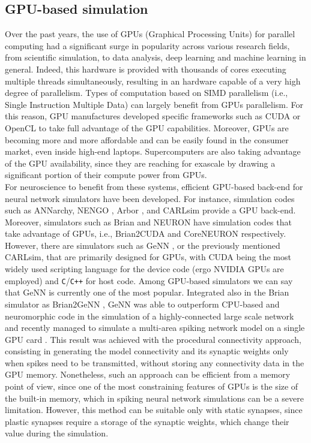 \documentclass[a4paper, 12pt, twoside, openright]{book}
\begin{document}
\subsection{GPU-based simulation}
Over the past years, the use of GPUs (Graphical Processing Units) for parallel computing had a significant surge in  popularity across various research fields, from scientific simulation, to data analysis, deep learning and machine learning in general. Indeed, this hardware is provided with thousands of cores executing multiple threads simultaneously, resulting in an hardware capable of a very high degree of parallelism. Types of computation based on SIMD parallelism (i.e., Single Instruction Multiple Data) can largely benefit from GPUs parallelism. For this reason, GPU manufactures developed specific frameworks such as CUDA or OpenCL to take full advantage of the GPU capabilities. Moreover, GPUs are becoming more and more affordable and can be easily found in the consumer market, even inside high-end laptops.
Supercomputers are also taking advantage of the GPU availability, since they are reaching for exascale by drawing a significant portion of their compute power from GPUs.\\
For neuroscience to benefit from these systems, efficient GPU-based back-end for neural network simulators have been developed. For instance, simulation codes such as ANNarchy, NENGO \cite{Bekolay2014}, Arbor \cite{paper:arbor2019}, and CARLsim \cite{CARLsim6} provide a GPU back-end. Moreover, simulators such as Brian and NEURON have simulation codes that take advantage of GPUs, i.e., Brian2CUDA \cite{Alevi2022} and CoreNEURON \cite{Kumbhar2019} respectively.\\
However, there are simulators such as GeNN \cite{Yavuz2016}, or the previously mentioned CARLsim, that are primarily designed for GPUs, with CUDA \cite{sanders10} being the most widely used scripting language for the device code (ergo NVIDIA GPUs are employed) and \verb!C!/\verb!C++! for host code. Among GPU-based simulators we can say that GeNN is currently one of the most popular. Integrated also in the Brian simulator as Brian2GeNN \cite{Stimberg2020}, GeNN was able to outperform CPU-based and neuromorphic code in the simulation of a highly-connected large scale network \cite{Knight2018} and recently managed to simulate a multi-area spiking network model \cite{Schuecker2017, Schmidt2018b, Schmidt2018} on a single GPU card \cite{Knight2021b}. This result was achieved with the procedural connectivity approach, consisting in generating the model connectivity and its synaptic weights only when spikes need to be transmitted, without storing any connectivity data in the GPU memory. Nonetheless, such an approach can be efficient from a memory point of view, since one of the most constraining features of GPUs is the size of the built-in memory, which in spiking neural network simulations can be a severe limitation. However, this method can be suitable only with static synapses, since plastic synapses require a storage of the synaptic weights, which change their value during the simulation.\\
\end{document}
